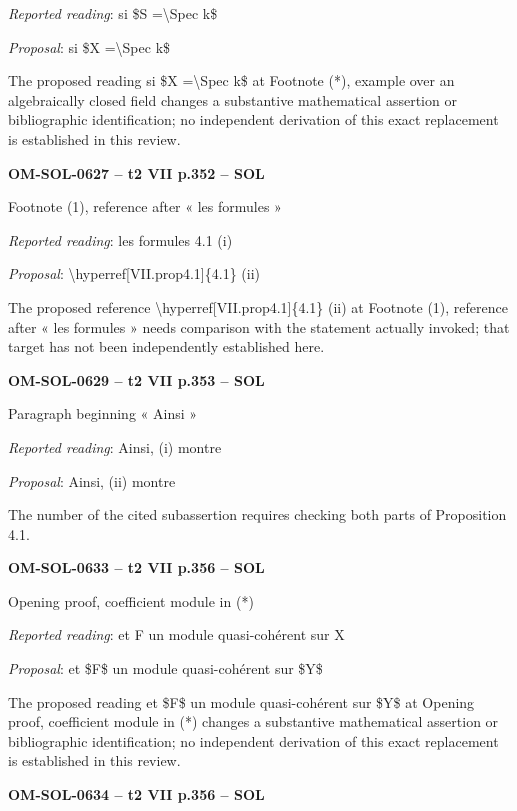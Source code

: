 \emph{Reported reading}: si \$S =\allowbreak  \textbackslash{}Spec k\$\par
\emph{Proposal}: si \$X =\allowbreak  \textbackslash{}Spec k\$\par
The proposed reading si \$X =\allowbreak  \textbackslash{}Spec k\$ at Footnote (*), example over an algebraically closed field changes a substantive mathematical assertion or bibliographic identification; no independent derivation of this exact replacement is established in this review.\par
\par\noindent\textbf{OM-SOL-0627 -- t2 VII p.352 -- SOL}\par
Footnote (1), reference after « les formules »\par
\emph{Reported reading}: les formules 4.1 (i)\par
\emph{Proposal}: \textbackslash{}hyperref[VII.prop4.1]\{4.1\} (ii)\par
The proposed reference \textbackslash{}hyperref[VII.prop4.1]\{4.1\} (ii) at Footnote (1), reference after « les formules » needs comparison with the statement actually invoked; that target has not been independently established here.\par
\par\noindent\textbf{OM-SOL-0629 -- t2 VII p.353 -- SOL}\par
Paragraph beginning « Ainsi »\par
\emph{Reported reading}: Ainsi, (i) montre\par
\emph{Proposal}: Ainsi, (ii) montre\par
The number of the cited subassertion requires checking both parts of Proposition 4.1.\par
\par\noindent\textbf{OM-SOL-0633 -- t2 VII p.356 -- SOL}\par
Opening proof, coefficient module in (*)\par
\emph{Reported reading}: et F un module quasi-cohérent sur X\par
\emph{Proposal}: et \$F\$ un module quasi-cohérent sur \$Y\$\par
The proposed reading et \$F\$ un module quasi-cohérent sur \$Y\$ at Opening proof, coefficient module in (*) changes a substantive mathematical assertion or bibliographic identification; no independent derivation of this exact replacement is established in this review.\par
\par\noindent\textbf{OM-SOL-0634 -- t2 VII p.356 -- SOL}\par
